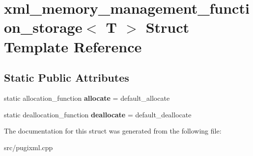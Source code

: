 \hypertarget{structxml__memory__management__function__storage}{}\section{xml\+\_\+memory\+\_\+management\+\_\+function\+\_\+storage$<$ T $>$ Struct Template Reference}
\label{structxml__memory__management__function__storage}
\subsection*{Static Public Attributes}
\begin{DoxyCompactItemize}
\item 
\mbox{\label{structxml__memory__management__function__storage_abb6865f8d07d27fd9273737c59f6e941}} 
static allocation\+\_\+function {\bfseries allocate} = default\+\_\+allocate
\item 
\mbox{\label{structxml__memory__management__function__storage_a1c80a9a045ed6cfb90b17a178e4b3512}} 
static deallocation\+\_\+function {\bfseries deallocate} = default\+\_\+deallocate
\end{DoxyCompactItemize}


The documentation for this struct was generated from the following file\+:\begin{DoxyCompactItemize}
\item 
src/pugixml.\+cpp\end{DoxyCompactItemize}
